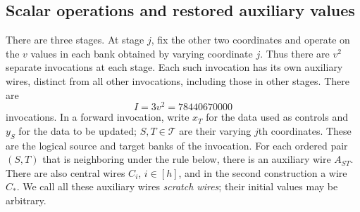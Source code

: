 \documentclass[11pt]{article}
\theoremstyle{definition}
\begin{document}
\subsection{Scalar operations and restored auxiliary values}

There are three stages.  At stage $j$, fix the other two coordinates and
operate on the $v$ values in each bank obtained by varying coordinate $j$.  Thus
there are $v^2$ separate invocations at each stage.
Each such invocation has its own auxiliary wires, distinct from all
other invocations, including those in other stages.  There are
\[
 I=3v^2=78440670000
\]
invocations.  In a forward invocation, write $x_T$ for the data used as
controls and $y_S$ for the data to be updated; $S,T\in\mathcal T$ are
their varying $j$th coordinates.  These are the logical source and
target banks of the invocation.  For each ordered pair $(S,T)$ that is
neighboring under the rule below, there is an auxiliary wire $A_{ST}$.
There are also central wires $C_i$, $i\in[h]$, and in the second
construction a wire $C_\ast$.  We call all these auxiliary wires
\emph{scratch wires}; their initial values may be arbitrary.
\end{document}
